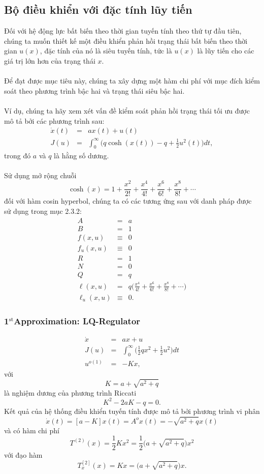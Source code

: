 \documentclass[12pt,a4paper]{report}
\begin{document}
\subsection{Bộ điều khiển với đặc tính lũy tiến}
Đối với hệ động lực bất biến theo thời gian tuyến tính theo thứ tự đầu tiên, chúng ta muốn thiết kế một điều khiển phản hồi trạng thái bất biến theo thời gian $u(x)$, đặc tính của nó là siêu tuyến tính, tức là $u(x)$ là lũy tiến cho các giá trị lớn hơn của trạng thái $x$.\\\\Để đạt được mục tiêu này, chúng ta xây dựng một hàm chi phí với mục đích kiểm soát theo phương trình bậc hai và trạng thái siêu bậc hai. \\\\
Ví dụ, chúng ta hãy xem xét vấn đề kiểm soát phản hồi trạng thái tối ưu được mô tả bởi các phương trình sau: \begin{eqnarray}
	\dot{x}(t) &=& ax(t) + u(t) \nonumber \\ J(u) &=& \int_{0}^{\infty}\Big(q\cosh(x(t))-q+\frac{1}{2}u^2(t)\Big)dt, \nonumber
\end{eqnarray} trong đó $a$ và $q$ là hằng số dương. \\\\ Sử dụng mở rộng chuỗi $$\cosh(x) = 1 + \frac{x^2}{2!} + \frac{x^4}{4!} + \frac{x^6}{6!} + \frac{x^8}{8!} + \cdots$$ đối với hàm cosin hyperbol, chúng ta có các tương ứng sau với danh pháp được sử dụng trong mục 2.3.2: \begin{eqnarray}
	A&=&a \nonumber\\B&=&1\nonumber\\f(x, u)&\equiv& 0 \nonumber \\ f_u(x, u)&\equiv& 0 \nonumber \\ R&=&1\nonumber\\N&=&0 \nonumber\\Q&=&q\nonumber\\\ell(x, u)&=&q\Big(\frac{x^4}{4!} + \frac{x^6}{6!}+\frac{x^8}{8!} + \cdots\Big) \nonumber\\\ell_u(x, u) &\equiv&0 \nonumber.
\end{eqnarray}
\subsubsection{\textbf{1}$^{\text{st}}$Approximation: LQ-Regulator} \begin{eqnarray}
	\dot{x}&=&ax + u \nonumber\\J(u)&=&\int_{0}^{\infty}\Big(\frac{1}{2}qx^2 + \frac{1}{2}u^2\Big)dt \nonumber\\u^{o(1)}&=&-Kx, \nonumber
\end{eqnarray} với $$K = a + \sqrt{a^2+q}$$ là nghiệm dương của phương trình Riccati $$K^2 - 2aK - q = 0.$$ Kết quả của hệ thống điều khiển tuyến tính được mô tả bởi phương trình vi phân $$\dot{x}(t) = [a - K]x(t) = A^ox(t) = -\sqrt{a^2+q}x(t)$$ và có hàm chi phí $$T^{(2)}(x) = \frac{1}{2}Kx^2 = \frac{1}{2}\Big(a+\sqrt{a^2+q}\Big)x^2$$ với đạo hàm $$T_x^{[2]}(x) = Kx = \Big(a + \sqrt{a^2+q}\Big)x.$$
\end{document}

